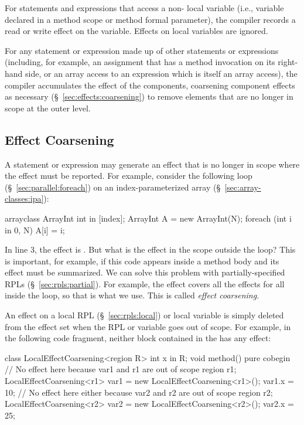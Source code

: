   For statements and expressions that
access a non- local variable (i.e., variable declared in a
method scope or method formal parameter), the compiler records a read
or write effect on the variable.  Effects on  local
variables are ignored.

 For any statement or
expression made up of other statements or expressions (including, for
example, an assignment that has a method invocation on its right-hand
side, or an array access to an expression which is itself an array
access), the compiler accumulates the effect of the components,
coarsening component effects as necessary
(\S~\ref{sec:effects:coarsening}) to remove elements that are no
longer in scope at the outer level.



\subsection{Effect Coarsening%
\label{sec:effects:coarsening}}

A statement or expression may generate an effect that is no longer in
scope where the effect must be reported.  For example, consider the
following  loop (\S~\ref{sec:parallel:foreach}) on an
index-parameterized array (\S~\ref{sec:array-classes:ipa}):
%
\begin{numbereddpjlisting}
arrayclass ArrayInt { int in [index]; }
ArrayInt A = new ArrayInt(N);
foreach (int i in 0, N) {
  A[i] = i;
}
\end{numbereddpjlisting}
%
In line 3, the effect is .  But what is the effect in
the scope outside the loop?  This is important, for example, if this
code appears inside a method body and its effect must be summarized.
We can solve this problem with partially-specified RPLs
(\S~\ref{sec:rpls:partial}).  For example, the effect 
covers all the effects  for all  inside the
loop, so that is what we use.  This is called \emph{effect
  coarsening}.

 An effect on a local RPL
(\S~\ref{sec:rpls:local}) or local variable is simply deleted from the
effect set when the RPL or variable goes out of scope.  For example,
in the following code fragment, neither block contained in the
 has any effect:
%
\begin{dpjlisting}
class LocalEffectCoarsening<region R> {
  int x in R;
  void method() 
    pure 
  {
    cobegin {
      // No effect here because var1 and r1 are out of scope
      {
        region r1;
        LocalEffectCoarsening<r1> var1 = 
          new LocalEffectCoarsening<r1>();
        var1.x = 10;
      }
      // No effect here either because var2 and r2 are out of scope
      {
        region r2;
        LocalEffectCoarsening<r2> var2 =
          new LocalEffectCoarsening<r2>();
        var2.x = 25;
      }
    }
  }    
}
\end{dpjlisting}


